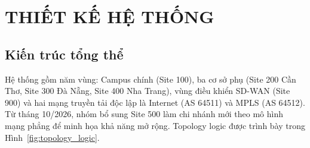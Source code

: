 \section{THIẾT KẾ HỆ THỐNG}\label{sec:thiet_ke}

\subsection{Kiến trúc tổng thể}

Hệ thống gồm năm vùng: Campus chính (Site 100), ba cơ sở phụ (Site 200 Cần Thơ, Site 300 Đà Nẵng, Site 400 Nha Trang), vùng điều khiển SD-WAN (Site 900) và hai mạng truyền tải độc lập là Internet (AS 64511) và MPLS (AS 64512). Từ tháng 10/2026, nhóm bổ sung Site 500 làm chi nhánh mới theo mô hình mạng phẳng để minh họa khả năng mở rộng. Topology logic được trình bày trong Hình~\ref{fig:topology_logic}.

